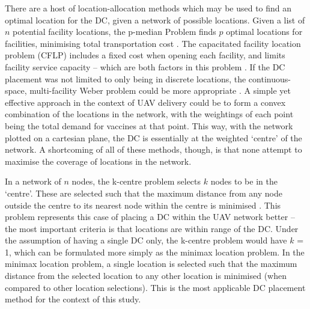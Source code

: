 There are a host of location-allocation methods which may be used to find an optimal location for the DC, given a network of possible locations.  Given a list of $n$ potential facility locations, the p-median Problem finds $p$ optimal locations for facilities, minimising total transportation cost \cite{beresnev_2018}. The capacitated facility location problem (CFLP) includes a fixed cost when opening each facility, and limits facility service capacity -- which are both factors in this problem \cite{beresnev_2018_CFLP}. If the DC placement was not limited to only being in discrete locations, the continuous-space, multi-facility Weber problem could be more appropriate \cite[p.270]{church2009business}. A simple yet effective approach in the context of UAV delivery could be to form a convex combination of the locations in the network, with the weightings of each point being the total demand for vaccines at that point. This way, with the network plotted on a cartesian plane, the DC is essentially at the weighted `centre' of the network. A shortcoming of all of these methods, though, is that none attempt to maximise the coverage of locations in the network. 

In a network of $n$ nodes, the k-centre problem selects $k$ nodes to be in the `centre'. These are selected such that the maximum distance from any node outside the centre to its nearest node within the centre is minimised \cite{mount_2017}. This problem represents this case of placing a DC within the UAV network better -- the most important criteria is that locations are within range of the DC. 
Under the assumption of having a single DC only, the k-centre problem would have $k$ = 1, which can be formulated more simply as the minimax location problem. In the minimax location problem, a single location is selected such that the maximum distance from the selected location to any other location is minimised (when compared to other location selections). This is the most applicable DC placement method for the context of this study.